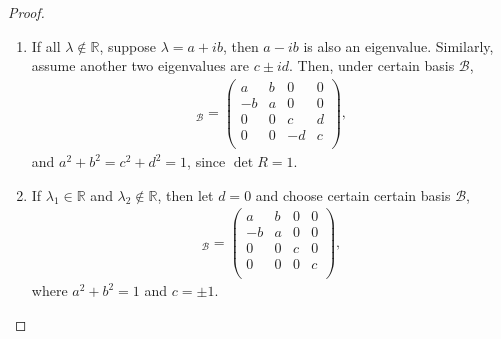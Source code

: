 \documentclass[11pt]{article}
\theoremstyle{definition}
\numberwithin{equation}{subsection}
\begin{document}
\begin{proof}
\begin{enumerate}[label=(\alph*)]
\begin{enumerate}[label=\arabic*)]
        \item If all $\lambda \notin \mathbb{R}$, suppose $\lambda = a + ib$, then $a - ib$ is also an eigenvalue. Similarly, assume another two eigenvalues are $c \pm id$. Then, under certain basis $\mathcal{B}$,
        \begin{align*}
            [R]_{\mathcal{B}} = \begin{pmatrix}
                a & b & 0 & 0 \\
                -b & a & 0 & 0\\
                0 & 0 & c & d \\
                0 & 0 & -d & c\\ 
            \end{pmatrix},
        \end{align*}
        and $a^2 + b^2 = c^2 + d^2 = 1$, since $\det R = 1$.
        
        \item If $\lambda_1 \in \mathbb{R}$ and $\lambda_2 \notin \mathbb{R}$, then let $d = 0$ and choose certain certain basis $\mathcal{B}$,
        \begin{align*}
            [R]_{\mathcal{B}} = \begin{pmatrix}
                a & b & 0 & 0 \\
                -b & a & 0 & 0\\
                0 & 0 & c & 0 \\
                0 & 0 & 0 & c\\ 
            \end{pmatrix},
        \end{align*}
        where $a^2 + b^2 = 1$ and $c = \pm 1$.
    \end{enumerate}
\end{enumerate}
\end{proof}

\medskip
\end{document}
